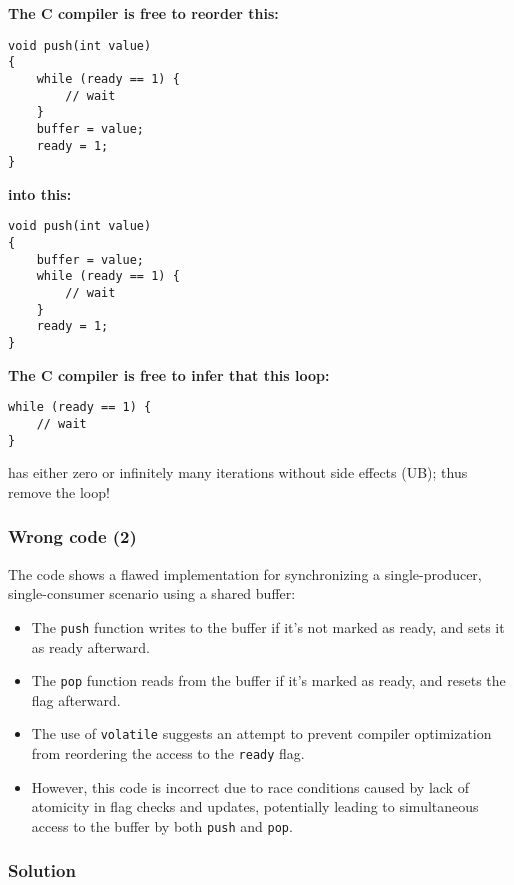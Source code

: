 \documentclass[12pt]{article}
\begin{document}
\textbf{The C compiler is free to reorder this:}

\begin{lstlisting}
void push(int value)
{
    while (ready == 1) {
        // wait
    }
    buffer = value;
    ready = 1;
}
\end{lstlisting}

\textbf{into this:}

\begin{lstlisting}
void push(int value)
{
    buffer = value;
    while (ready == 1) {
        // wait
    }
    ready = 1;
}
\end{lstlisting}


\textbf{The C compiler is free to infer that this loop:}

\begin{lstlisting}
while (ready == 1) {
    // wait
}
\end{lstlisting}

has either zero or infinitely many iterations without side effects (UB); thus remove the loop!

\subsubsection{Wrong code (2)}

The code shows a flawed implementation for synchronizing a single-producer, single-consumer scenario using a shared buffer:
\begin{itemize}
  \item The \texttt{push} function writes to the buffer if it's not marked as ready, and sets it as ready afterward.
  \item The \texttt{pop} function reads from the buffer if it's marked as ready, and resets the flag afterward.
  \item The use of \texttt{volatile} suggests an attempt to prevent compiler optimization from reordering the access to the \texttt{ready} flag.
  \item However, this code is incorrect due to race conditions caused by lack of atomicity in flag checks and updates, potentially leading to simultaneous access to the buffer by both \texttt{push} and \texttt{pop}.
\end{itemize}

\subsubsection{Solution}
\end{document}
